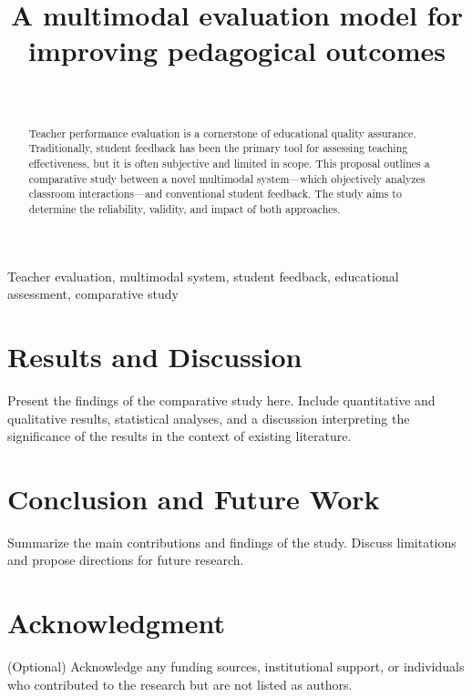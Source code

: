 \documentclass[onecolumn]{IEEEtran}
\title{A multimodal evaluation model for improving pedagogical outcomes}
\author{
    \IEEEauthorblockN{Shafiqul Islam} \\
    \IEEEauthorblockA{
        \textit{Begum Rokeya University,Rangpur} \\
    }
}
\begin{document}
\maketitle

\begin{abstract}
Teacher performance evaluation is a cornerstone of educational quality assurance. Traditionally, student feedback has been the primary tool for assessing teaching effectiveness, but it is often subjective and limited in scope. This proposal outlines a comparative study between a novel multimodal system—which objectively analyzes classroom interactions—and conventional student feedback. The study aims to determine the reliability, validity, and impact of both approaches.
\end{abstract}

\begin{IEEEkeywords}
Teacher evaluation, multimodal system, student feedback, educational assessment, comparative study
\end{IEEEkeywords}








\section{Results and Discussion}
Present the findings of the comparative study here. Include quantitative and qualitative results, statistical analyses, and a discussion interpreting the significance of the results in the context of existing literature.

\section{Conclusion and Future Work}
Summarize the main contributions and findings of the study. Discuss limitations and propose directions for future research.

\section*{Acknowledgment}
(Optional) Acknowledge any funding sources, institutional support, or individuals who contributed to the research but are not listed as authors.



\end{document}
